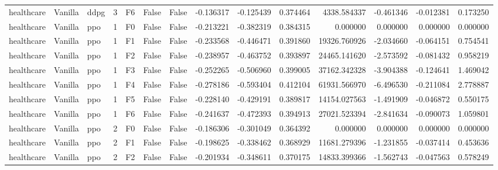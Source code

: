 \begin{tabular}{lllrlllrrrrrrr}
healthcare & Vanilla &      ddpg &     3 &  F6 &           False &            False & -0.136317 & -0.125439 & 0.374464 &      4338.584337 &          -0.461346 &       -0.012381 &            0.173250 \\
healthcare & Vanilla &       ppo &     1 &  F0 &           False &            False & -0.213221 & -0.382319 & 0.384315 &         0.000000 &           0.000000 &        0.000000 &            0.000000 \\
healthcare & Vanilla &       ppo &     1 &  F1 &           False &            False & -0.233568 & -0.446471 & 0.391860 &     19326.760926 &          -2.034660 &       -0.064151 &            0.754541 \\
healthcare & Vanilla &       ppo &     1 &  F2 &           False &            False & -0.238957 & -0.463752 & 0.393897 &     24465.141620 &          -2.573592 &       -0.081432 &            0.958219 \\
healthcare & Vanilla &       ppo &     1 &  F3 &           False &            False & -0.252265 & -0.506960 & 0.399005 &     37162.342328 &          -3.904388 &       -0.124641 &            1.469042 \\
healthcare & Vanilla &       ppo &     1 &  F4 &           False &            False & -0.278186 & -0.593404 & 0.412104 &     61931.566970 &          -6.496530 &       -0.211084 &            2.778887 \\
healthcare & Vanilla &       ppo &     1 &  F5 &           False &            False & -0.228140 & -0.429191 & 0.389817 &     14154.027563 &          -1.491909 &       -0.046872 &            0.550175 \\
healthcare & Vanilla &       ppo &     1 &  F6 &           False &            False & -0.241637 & -0.472393 & 0.394913 &     27021.523394 &          -2.841634 &       -0.090073 &            1.059801 \\
healthcare & Vanilla &       ppo &     2 &  F0 &           False &            False & -0.186306 & -0.301049 & 0.364392 &         0.000000 &           0.000000 &        0.000000 &            0.000000 \\
healthcare & Vanilla &       ppo &     2 &  F1 &           False &            False & -0.198625 & -0.338462 & 0.368929 &     11681.279396 &          -1.231855 &       -0.037414 &            0.453636 \\
healthcare & Vanilla &       ppo &     2 &  F2 &           False &            False & -0.201934 & -0.348611 & 0.370175 &     14833.399366 &          -1.562743 &       -0.047563 &            0.578249 \\

\end{tabular}
